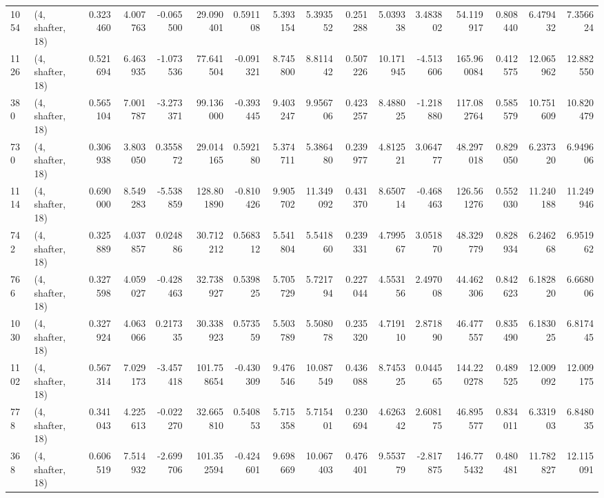 \begin{tabular}{llrrrrrrrrrrrrrr}
1054 &  (4, shafter, 18) &   0.323460 &   4.007763 &  -0.065500 &     29.090401 &    0.591108 &    5.393154 &    5.393552 &  0.251288 &   5.039338 &   3.483802 &    54.119917 &   0.808440 &   6.479432 &   7.356624 \\
1126 &  (4, shafter, 18) &   0.521694 &   6.463935 &  -1.073536 &     77.641504 &   -0.091321 &    8.745800 &    8.811442 &  0.507226 &  10.171945 &  -4.513606 &   165.960084 &   0.412575 &  12.065962 &  12.882550 \\
380  &  (4, shafter, 18) &   0.565104 &   7.001787 &  -3.273371 &     99.136000 &   -0.393445 &    9.403247 &    9.956706 &  0.423257 &   8.488025 &  -1.218880 &   117.082764 &   0.585579 &  10.751609 &  10.820479 \\
730  &  (4, shafter, 18) &   0.306938 &   3.803050 &   0.355872 &     29.014165 &    0.592180 &    5.374711 &    5.386480 &  0.239977 &   4.812521 &   3.064777 &    48.297018 &   0.829050 &   6.237320 &   6.949606 \\
1114 &  (4, shafter, 18) &   0.690000 &   8.549283 &  -5.538859 &    128.801890 &   -0.810426 &    9.905702 &   11.349092 &  0.431370 &   8.650714 &  -0.468463 &   126.561276 &   0.552030 &  11.240188 &  11.249946 \\
742  &  (4, shafter, 18) &   0.325889 &   4.037857 &   0.024886 &     30.712212 &    0.568312 &    5.541804 &    5.541860 &  0.239331 &   4.799567 &   3.051870 &    48.329779 &   0.828934 &   6.246268 &   6.951962 \\
766  &  (4, shafter, 18) &   0.327598 &   4.059027 &  -0.428463 &     32.738927 &    0.539825 &    5.705729 &    5.721794 &  0.227044 &   4.553156 &   2.497008 &    44.462306 &   0.842623 &   6.182820 &   6.668006 \\
1030 &  (4, shafter, 18) &   0.327924 &   4.063066 &   0.217335 &     30.338923 &    0.573559 &    5.503789 &    5.508078 &  0.235320 &   4.719110 &   2.871890 &    46.477557 &   0.835490 &   6.183025 &   6.817445 \\
1102 &  (4, shafter, 18) &   0.567314 &   7.029173 &  -3.457418 &    101.758654 &   -0.430309 &    9.476546 &   10.087549 &  0.436088 &   8.745325 &   0.044565 &   144.220278 &   0.489525 &  12.009092 &  12.009175 \\
778  &  (4, shafter, 18) &   0.341043 &   4.225613 &  -0.022270 &     32.665810 &    0.540853 &    5.715358 &    5.715401 &  0.230694 &   4.626342 &   2.608175 &    46.895577 &   0.834011 &   6.331903 &   6.848035 \\
368  &  (4, shafter, 18) &   0.606519 &   7.514932 &  -2.699706 &    101.352594 &   -0.424601 &    9.698669 &   10.067403 &  0.476401 &   9.553779 &  -2.817875 &   146.775432 &   0.480481 &  11.782827 &  12.115091 \\

\end{tabular}
